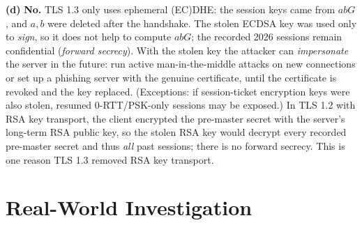 \documentclass[11pt,a4paper]{article}
\begin{document}
\textbf{(d)} \textbf{No.} TLS 1.3 only uses ephemeral (EC)DHE: the session keys came from $abG$, and
$a, b$ were deleted after the handshake. The stolen ECDSA key was used only to \emph{sign}, so it does not
help to compute $abG$; the recorded 2026 sessions remain confidential (\emph{forward secrecy}). With
the stolen key the attacker can \emph{impersonate} the server in the future: run active
man-in-the-middle attacks on new connections or set up a phishing server with the genuine certificate,
until the certificate is revoked and the key replaced. (Exceptions: if session-ticket encryption keys
were also stolen, resumed 0-RTT/PSK-only sessions may be exposed.) In TLS 1.2 with RSA key transport, the client
encrypted the pre-master secret with the server's long-term RSA public key, so the stolen RSA key would
decrypt every recorded pre-master secret and thus \emph{all} past sessions; there is no forward secrecy.
This is one reason TLS 1.3 removed RSA key transport.

\section*{Real-World Investigation}
\end{document}
